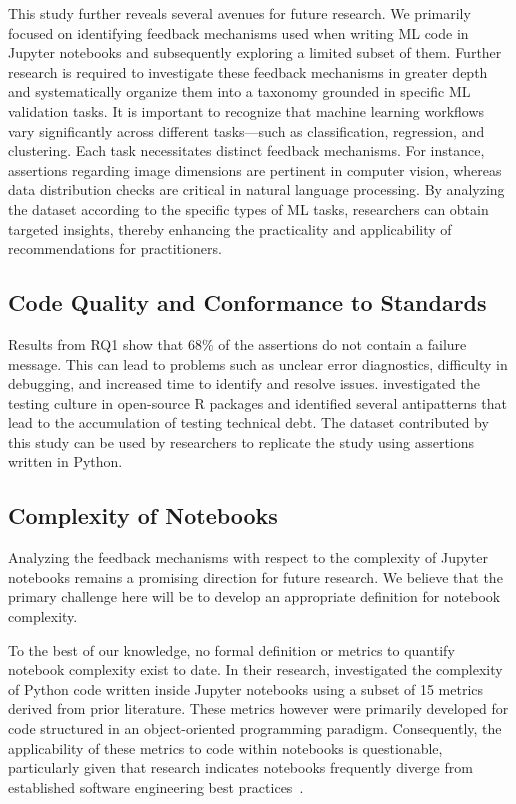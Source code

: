 \documentclass[smallextended]{svjour3}       %
\begin{document}
This study further reveals several avenues for future research. We primarily focused on identifying feedback mechanisms used when writing ML code in Jupyter notebooks and subsequently exploring a limited subset of them. Further research is required to investigate these feedback mechanisms in greater depth and systematically organize them into a taxonomy grounded in specific ML validation tasks. It is important to recognize that machine learning workflows vary significantly across different tasks---such as classification, regression, and clustering. Each task necessitates distinct feedback mechanisms. For instance, assertions regarding image dimensions are pertinent in computer vision, whereas data distribution checks are critical in natural language processing. By analyzing the dataset according to the specific types of ML tasks, researchers can obtain targeted insights, thereby enhancing the practicality and applicability of recommendations for practitioners.

\subsection{Code Quality and Conformance to Standards}

Results from RQ1 show that 68\% of the assertions do not contain a failure message. This can lead to problems such as unclear error diagnostics, difficulty in debugging, and increased time to identify and resolve issues. \citet{vidoni2021evaluating} investigated the testing culture in open-source R packages and identified several antipatterns that lead to the accumulation of testing technical debt. The dataset contributed by this study can be used by researchers to replicate the \citet{vidoni2021evaluating} study using assertions written in Python.

\subsection{Complexity of Notebooks}

Analyzing the feedback mechanisms with respect to the complexity of Jupyter notebooks remains a promising direction for future research. We believe that the primary challenge here will be to develop an appropriate definition for notebook complexity.

To the best of our knowledge, no formal definition or metrics to quantify notebook complexity exist to date. In their research, \citet{grotov2022large-scale} investigated the complexity of Python code written inside Jupyter notebooks using a subset of 15 metrics derived from prior literature. These metrics however were primarily developed for code structured in an object-oriented programming paradigm. Consequently, the applicability of these metrics to code within notebooks is questionable, particularly given that research indicates notebooks frequently diverge from established software engineering best practices~\citep{pimentel2019large-scale}.
\end{document}
